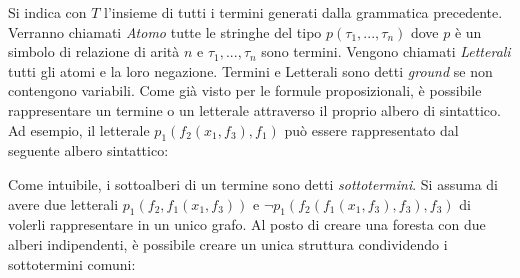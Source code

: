 \documentclass[./main.tex]{subfiles}
\begin{document}
Si indica con $T$ l'insieme di tutti i termini generati dalla grammatica precedente.
Verranno chiamati \textit{Atomo} tutte le stringhe del tipo $p(\tau_1, ..., \tau_n)$ dove $p$ è un simbolo di relazione
di arità $n$ e $\tau_1, ..., \tau_n$ sono termini.
Vengono chiamati \textit{Letterali} tutti gli atomi e la loro negazione.
Termini e Letterali sono detti \textit{ground} se non contengono variabili.
Come già visto per le formule proposizionali, è possibile rappresentare un termine o un letterale
attraverso il proprio albero di sintattico. Ad esempio, il letterale $p_1(f_2(x_1, f_3), f_1)$ può essere rappresentato dal seguente albero sintattico:

\begin{center}
\end{center}

Come intuibile, i sottoalberi di un termine sono detti \textit{sottotermini}. Si assuma di avere due letterali $p_1(f_2, f_1(x_1, f_3))$ e 
$\lnot p_1(f_2(f_1(x_1, f_3), f_3), f_3)$ di volerli rappresentare in un unico grafo. Al posto di creare una foresta con due alberi indipendenti,
è possibile creare un unica struttura condividendo i sottotermini comuni:

\begin{center}
\end{center}
\end{document}
